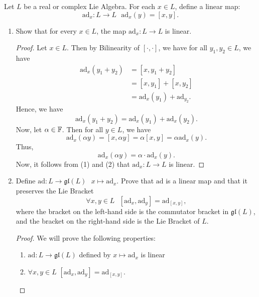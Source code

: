 \documentclass[a4paper]{article}
\begin{document}
\begin{problem}
    Let \( L  \) be a real or complex Lie Algebra. For each \( x \in L  \), define a linear map: 
    \[ {\text{ad} }_{x} : L \to L  \ \ \ {\text{ad} }_{x}(y) = [x,y].\]
\end{problem}
\begin{enumerate}
    \item Show that for every \( x \in L  \), the map \( {\text{ad} }_{x}: L \to L  \) is linear.
        \begin{proof}
            Let \( x \in  L \). Then by Bilinearity of \( [\cdot, \cdot] \), we have for all \( {y}_{1}, {y}_{2} \in L  \), we have 
            \begin{align*}
                {\text{ad}}_{x}({y}_{1} + {y}_{2}) &= [x, {y}_{1} + {y}_{2}] \\
                                                   &= [x, {y}_{1}] + [x, {y}_{2}] \\
                                                   &= {\text{ad} }_{x}({y}_{1}) + {\text{ad} }_{{y}_{2}}.
            \end{align*}
            Hence, we have 
            \[ {\text{ad} }_{x}({y}_{1} + {y}_{2}) = {\text{ad} }_{x}({y}_{1}) + {\text{ad} }_{x}({y}_{2}). \tag{1} \]
            Now, let \( \alpha \in \mathbb{F}  \). Then for all \( y \in L  \), we have
            \[ \text{ad}_{x} (\alpha y) = [x, \alpha y ] = \alpha [x,y] = \alpha \text{ad}_x(y).   \]
            Thus, 
            \[ \text{ad}_x(\alpha y) = \alpha \cdot \text{ad}_x(y). \tag{2}  \]
            Now, it follows from (1) and (2) that \( \text{ad}_x : L \to L  \) is linear.
        \end{proof}
    \item Define \( \text{ad}: L \to \mathfrak{g} \mathfrak{l} (L)  \ \ \ x \mapsto \text{ad}_x   \). 
    Prove that \( \text{ad}  \) is a linear map and that it preserves the Lie Bracket 
    \[ \forall x,y \in L \ \ \ [\text{ad}_x , \text{ad}_{y}    ]  = \text{ad}_{[x,y]}, \]
    where the bracket on the left-hand side is the commutator bracket in \( \mathfrak{g} \mathfrak{l} (L) \), and the bracket on the right-hand side is the Lie Bracket of \( L  \).
    \begin{proof}
    We will prove the following properties:
    \begin{enumerate}
        \item[(1)] \( \text{ad}: L \to \mathfrak{gl}(L)    \) defined by \( x \mapsto \text{ad}_x  \) is linear
        \item[(2)] \( \forall x,y \in L  \) \( [\text{ad}_x, \text{ad}_y   ] = \text{ad}_{[x,y]}  \).

\end{enumerate}
\end{proof}
\end{enumerate}
\end{document}
